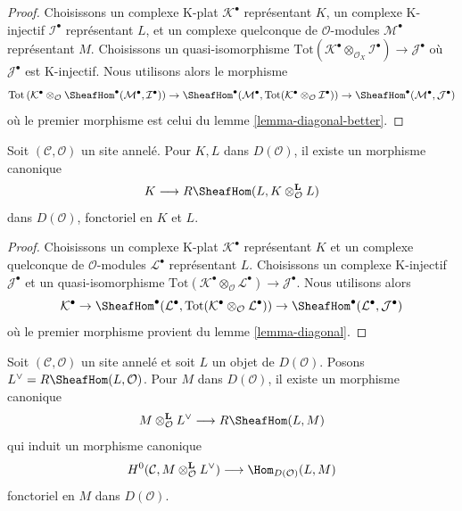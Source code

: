 \begin{proof}
Choisissons un complexe K-plat $\mathcal{K}^\bullet$ représentant $K$, un
complexe K-injectif $\mathcal{I}^\bullet$ représentant $L$, et un complexe
quelconque de $\mathcal{O}$-modules $\mathcal{M}^\bullet$ représentant $M$.
Choisissons un quasi-isomorphisme
$\text{Tot}(\mathcal{K}^\bullet \otimes_{\mathcal{O}_X} \mathcal{I}^\bullet)
\to \mathcal{J}^\bullet$
où $\mathcal{J}^\bullet$ est K-injectif. Nous utilisons alors le morphisme
$$
\text{Tot}\left(
\mathcal{K}^\bullet \otimes_\mathcal{O}
\SheafHom^\bullet(\mathcal{M}^\bullet, \mathcal{I}^\bullet)
\right)
\to
\SheafHom^\bullet(\mathcal{M}^\bullet,
\text{Tot}(\mathcal{K}^\bullet \otimes_\mathcal{O} \mathcal{I}^\bullet))
\to
\SheafHom^\bullet(\mathcal{M}^\bullet, \mathcal{J}^\bullet)
$$
où le premier morphisme est celui du lemme \ref{lemma-diagonal-better}.
\end{proof}

\begin{lemma}
\label{lemma-internal-hom-diagonal}
Soit $(\mathcal{C}, \mathcal{O})$ un site annelé. Pour $K, L$ dans
$D(\mathcal{O})$, il existe un morphisme canonique
$$
K \longrightarrow R\SheafHom(L, K \otimes_\mathcal{O}^\mathbf{L} L)
$$
dans $D(\mathcal{O})$, fonctoriel en $K$ et $L$.
\end{lemma}

\begin{proof}
Choisissons un complexe K-plat $\mathcal{K}^\bullet$ représentant $K$ et un
complexe quelconque de $\mathcal{O}$-modules $\mathcal{L}^\bullet$
représentant $L$. Choisissons un complexe K-injectif
$\mathcal{J}^\bullet$ et un quasi-isomorphisme
$\text{Tot}(\mathcal{K}^\bullet \otimes_\mathcal{O} \mathcal{L}^\bullet)
\to \mathcal{J}^\bullet$. Nous utilisons alors
$$
\mathcal{K}^\bullet \to
\SheafHom^\bullet(\mathcal{L}^\bullet,
\text{Tot}(\mathcal{K}^\bullet \otimes_\mathcal{O} \mathcal{L}^\bullet))
\to
\SheafHom^\bullet(\mathcal{L}^\bullet, \mathcal{J}^\bullet)
$$
où le premier morphisme provient du lemme \ref{lemma-diagonal}.
\end{proof}

\begin{lemma}
\label{lemma-dual}
Soit $(\mathcal{C}, \mathcal{O})$ un site annelé et soit $L$ un objet de
$D(\mathcal{O})$. Posons $L^\vee = R\SheafHom(L, \mathcal{O})$.
Pour $M$ dans $D(\mathcal{O})$, il existe un morphisme canonique
\begin{equation}
\label{equation-eval}
M \otimes^\mathbf{L}_\mathcal{O} L^\vee \longrightarrow R\SheafHom(L, M)
\end{equation}
qui induit un morphisme canonique
$$
H^0(\mathcal{C}, M \otimes_\mathcal{O}^\mathbf{L} L^\vee)
\longrightarrow
\Hom_{D(\mathcal{O})}(L, M)
$$
fonctoriel en $M$ dans $D(\mathcal{O})$.
\end{lemma}

